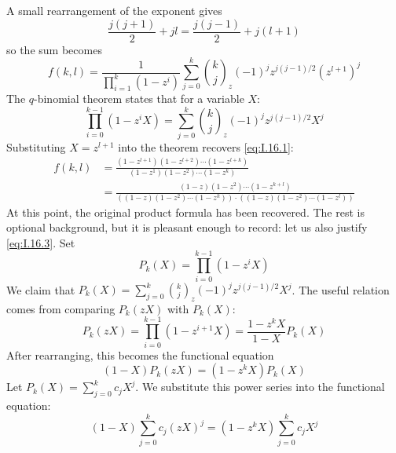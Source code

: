 A small rearrangement of the exponent gives
\begin{equation*}
    \frac{j(j + 1)}{2} + jl = \frac{j(j - 1)}{2} + j(l + 1)
\end{equation*}
so the sum becomes
\begin{equation*}
    f(k, l) = \frac{1}{\prod_{i = 1}^{k}(1 - z^{i})} \sum_{j = 0}^{k} \binom{k}{j}_{z}(-1)^{j}z^{j(j - 1)/2}(z^{l + 1})^{j}
\end{equation*}
The $q$-binomial theorem states that for a variable $X$:
\begin{equation} \label{eq:I.16.3}
    \prod_{i = 0}^{k - 1}(1 - z^{i}X) = \sum_{j = 0}^{k} \binom{k}{j}_{z}(-1)^{j}z^{j(j - 1)/2}X^{j}
\end{equation}
Substituting $X = z^{l + 1}$ into the theorem recovers \eqref{eq:I.16.1}:
\begin{equation*}
    \begin{aligned}
        f(k, l)
        &= \frac{(1 - z^{l + 1})(1 - z^{l + 2}) \cdots (1 - z^{l + k})}{(1 - z^{1})(1 - z^{2}) \cdots (1 - z^{k})} \\
        &= \frac{(1 - z)(1 - z^{2}) \cdots (1 - z^{k + l})}{((1 - z)(1 - z^{2}) \cdots (1 - z^{k})) \cdot ((1 - z)(1 - z^{2}) \cdots (1 - z^{l}))}
    \end{aligned}
\end{equation*}
At this point, the original product formula has been recovered. The rest is optional background, but it is pleasant enough to record: let us also justify \eqref{eq:I.16.3}. Set
\begin{equation*}
    P_{k}(X) = \prod_{i = 0}^{k - 1}(1 - z^{i}X)
\end{equation*}
We claim that $P_{k}(X) = \sum_{j = 0}^{k} \binom{k}{j}_{z}(-1)^{j}z^{j(j - 1)/2}X^{j}$.
The useful relation comes from comparing $P_k(zX)$ with $P_k(X)$:
\begin{equation*}
    P_{k}(zX) = \prod_{i = 0}^{k - 1}(1 - z^{i + 1}X) = \frac{1 - z^{k}X}{1 - X}P_{k}(X)
\end{equation*}
After rearranging, this becomes the functional equation
\begin{equation*}
    (1 - X)P_{k}(zX) = (1 - z^{k}X)P_{k}(X)
\end{equation*}
Let $P_{k}(X) = \sum_{j = 0}^{k} c_{j}X^{j}$. We substitute this power series into the functional equation:
\begin{equation*}
    (1 - X)\sum_{j = 0}^{k} c_{j}(zX)^{j} = (1 - z^{k}X)\sum_{j = 0}^{k} c_{j}X^{j}
\end{equation*}
